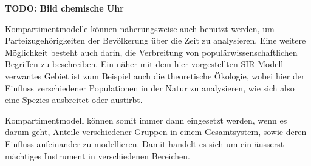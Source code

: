 \begin{refsection}
\textbf{TODO: Bild chemische Uhr}

Kompartimentmodelle können näherungsweise auch benutzt werden, um Parteizugehörigkeiten der Bevölkerung über die Zeit zu analysieren. 
Eine weitere Möglichkeit besteht auch darin, die Verbreitung von populärwissenschaftlichen Begriffen zu beschreiben. 
Ein näher mit dem hier vorgestellten SIR-Modell verwantes Gebiet ist zum Beispiel auch die theoretische Ökologie, wobei hier der Einfluss verschiedener Populationen in der Natur zu analysieren, wie sich also eine Spezies ausbreitet oder austirbt.

Kompartimentmodell können somit immer dann eingesetzt werden, wenn es darum geht, Anteile verschiedener Gruppen in einem Gesamtsystem, sowie deren Einfluss aufeinander zu modellieren. 
Damit handelt es sich um ein äusserst mächtiges Instrument in verschiedenen Bereichen. 


\printbibliography[heading=subbibliography]
\end{refsection}

